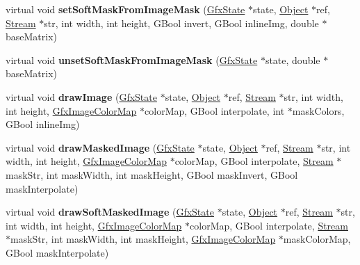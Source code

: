 \begin{DoxyCompactItemize}
\item 
\mbox{\label{class_splash_output_dev_a6642a5b0208642713115c3d2782e6ce0}} 
virtual void {\bfseries set\+Soft\+Mask\+From\+Image\+Mask} (\hyperlink{class_gfx_state}{Gfx\+State} $\ast$state, \hyperlink{class_object}{Object} $\ast$ref, \hyperlink{class_stream}{Stream} $\ast$str, int width, int height, G\+Bool invert, G\+Bool inline\+Img, double $\ast$base\+Matrix)
\item 
\mbox{\label{class_splash_output_dev_a3eac1c51612d12735b8c2f4fa3a3eb66}} 
virtual void {\bfseries unset\+Soft\+Mask\+From\+Image\+Mask} (\hyperlink{class_gfx_state}{Gfx\+State} $\ast$state, double $\ast$base\+Matrix)
\item 
\mbox{\label{class_splash_output_dev_aa48ad5492f0c0392c517f0ecc297d262}} 
virtual void {\bfseries draw\+Image} (\hyperlink{class_gfx_state}{Gfx\+State} $\ast$state, \hyperlink{class_object}{Object} $\ast$ref, \hyperlink{class_stream}{Stream} $\ast$str, int width, int height, \hyperlink{class_gfx_image_color_map}{Gfx\+Image\+Color\+Map} $\ast$color\+Map, G\+Bool interpolate, int $\ast$mask\+Colors, G\+Bool inline\+Img)
\item 
\mbox{\label{class_splash_output_dev_aead002098984f3cc349c89761dd4c7ce}} 
virtual void {\bfseries draw\+Masked\+Image} (\hyperlink{class_gfx_state}{Gfx\+State} $\ast$state, \hyperlink{class_object}{Object} $\ast$ref, \hyperlink{class_stream}{Stream} $\ast$str, int width, int height, \hyperlink{class_gfx_image_color_map}{Gfx\+Image\+Color\+Map} $\ast$color\+Map, G\+Bool interpolate, \hyperlink{class_stream}{Stream} $\ast$mask\+Str, int mask\+Width, int mask\+Height, G\+Bool mask\+Invert, G\+Bool mask\+Interpolate)
\item 
\mbox{\label{class_splash_output_dev_ab01959ecca430d1f238334e5eae989b9}} 
virtual void {\bfseries draw\+Soft\+Masked\+Image} (\hyperlink{class_gfx_state}{Gfx\+State} $\ast$state, \hyperlink{class_object}{Object} $\ast$ref, \hyperlink{class_stream}{Stream} $\ast$str, int width, int height, \hyperlink{class_gfx_image_color_map}{Gfx\+Image\+Color\+Map} $\ast$color\+Map, G\+Bool interpolate, \hyperlink{class_stream}{Stream} $\ast$mask\+Str, int mask\+Width, int mask\+Height, \hyperlink{class_gfx_image_color_map}{Gfx\+Image\+Color\+Map} $\ast$mask\+Color\+Map, G\+Bool mask\+Interpolate)

\end{DoxyCompactItemize}
